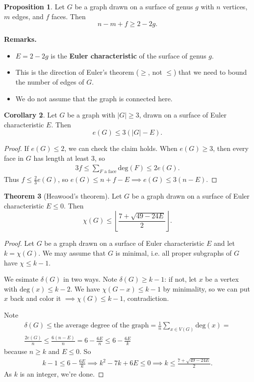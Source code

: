 \documentclass{article}
\theoremstyle{definition}
\newtheorem{theorem}{Theorem}[section]
\newtheorem{cor}[theorem]{Corollary}
\newtheorem{prop}[theorem]{Proposition}
\begin{document}
\begin{prop}
    Let $G$ be a graph drawn on a surface of genus $g$ with $n$ vertices, $m$ edges, and $f$ faces. Then $$n-m+f \ge 2 - 2g.$$
\end{prop}
\textbf{Remarks.}
\begin{itemize}
    \item $E = 2 - 2g$ is the \textbf{Euler characteristic} of the surface of genus $g$.
    \item This is the direction of Euler's theorem ($\ge $, not $\le$) that we need to bound the number of edges of $G$.
    \item We do not assume that the graph is connected here.
\end{itemize} 
\begin{cor}
    Let $G$ be a graph with $|G|\ge 3$, drawn on a surface of Euler characteristic $E$. Then $$e(G)\le 3(|G|-E).$$
\end{cor}
\begin{proof}
    If $e(G)\le 2$, we can check the claim holds. When $e(G) \ge 3$, then every face in $G$ has length at least 3, so
    \begin{align*}
        3f \le \sum_{F \text{ a face}}^{} \text{deg}(F) \le 2e(G).
    \end{align*}
    Thus $f \le \frac{2}{3}e(G)$, so $e(G) \le n + f - E \implies e(G) \le 3(n-E)$.
\end{proof}
\begin{theorem}[Heawood's theorem]
    Let $G$ be a graph drawn on a surface of Euler characteristic $E \le 0$. Then
    \[
    \chi(G) \le \left\lfloor \frac{7+\sqrt{49-24E}}{2} \right\rfloor.
    \]
\end{theorem}
\begin{proof}
    Let $G$ be a graph drawn on a surface of Euler characteristic $E$ and let $k = \chi(G)$. We may assume that $G$ is minimal, i.e. all proper subgraphs of $G$ have $\chi \le k-1$.
    \vspace{1mm}
    
    We esimate $\delta(G)$ in two ways. Note $\delta(G)\ge k-1$: if not, let $x$ be a vertex with $\text{deg}(x)\le k-2$. We have $\chi(G-x)\le k-1$ by minimality, so we can put $x$ back and color it $\implies \chi(G)\le k-1$, contradiction.
    \vspace{1mm}
    
    Note 
    \begin{align*}
        \delta(G)\le \text{the average degree of the graph} = \frac{1}{n}\sum_{x \in V(G)}^{} \text{deg}(x) = \\
        \frac{2e(G)}{n} \le \frac{6(n-E)}{n} = 6 - \frac{6E}{n} \le 6 - \frac{6E}{k}
    \end{align*}
    because $n\ge k$ and $E \le 0$. So 
    \begin{align*}
        k-1 \le 6 - \frac{6E}{k} \implies k^2 - 7k + 6E \le 0 \implies k \le \frac{7 + \sqrt{49-24E}}{2}.
    \end{align*}
    As $k$ is an integer, we're done.
\end{proof}
\end{document}
